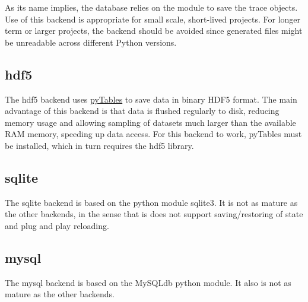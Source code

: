 As its name implies, the  database relies on the  module to save the trace objects. Use of this backend is appropriate for small scale, short-lived projects. For longer term or larger projects, the  backend should be avoided since generated files might be unreadable across different Python versions.



\hypertarget{hdf5}{}
\subsection*{hdf5}
\label{hdf5}

The hdf5 backend uses \href{http://www.pytables.org/moin}{pyTables} to save data in binary HDF5 format. The main advantage of this backend is that data is flushed regularly to disk, reducing memory usage and allowing sampling of datasets much larger than the available RAM memory, speeding up data access. For this backend to work, pyTables must be installed, which in turn requires the hdf5 library.



\hypertarget{sqlite}{}
\subsection*{sqlite}
\label{sqlite}

The sqlite backend is based on the python module sqlite3. It is not as mature as the other backends, in the sense that is does not support saving/restoring of state and plug and play reloading.



\hypertarget{mysql}{}
\subsection*{mysql}
\label{mysql}

The mysql backend is based on the MySQLdb python module. It also is not as mature as the other backends.

